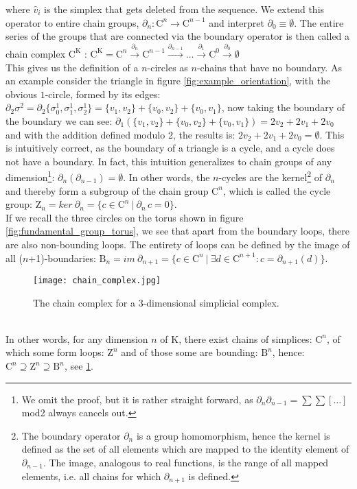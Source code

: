 where $\hat{v}_{i}$ is the simplex that gets deleted from the sequence.
We extend this operator to entire chain groups, $\partial_{n}: \mathrm{C}^{n} \rightarrow \mathrm{C}^{n-1}$ and interpret $\partial_{0} \equiv \emptyset$.
The entire series of the groups that are connected via the boundary operator is then called a chain complex $\mathrm{C}^{\mathrm{K}}$ : $\mathrm{C}^{\mathrm{K}} = \mathrm{C}^{n} \overset{\partial_{n}}{\longrightarrow} \mathrm{C}^{n-1} \overset{\partial_{n-1}}{\longrightarrow} \dots \overset{\partial_{1}}{\longrightarrow} \mathrm{C}^{0} \overset{\partial_{0}}{\longrightarrow} \emptyset$\\
This gives us the definition of a $n$-circles as $n$-chains that have no boundary.
As an example consider the triangle in figure \ref{fig:example_orientation}, with the obvious $1$-circle, formed by its edges: $\partial_{2} \sigma^{2} = \partial_{2} \{ \sigma^{1}_{0}, \sigma^{1}_{1}, \sigma^{1}_{2} \} = \{v_{1}, v_{2}\} + \{v_{0}, v_{2}\} + \{v_{0}, v_{1}\}$, now taking the boundary of the boundary we can see: $\partial_{1} (\{v_{1}, v_{2}\} + \{v_{0}, v_{2}\} + \{v_{0}, v_{1}\}) = 2v_{2}+2v_{1}+2v_{0}$ and with the addition defined modulo 2, the results is: $2v_{2}+2v_{1}+2v_{0} = \emptyset$.
This is intuitively correct, as the boundary of a triangle is a cycle, and a cycle does not have a boundary.
In fact, this intuition generalizes to chain groups of any dimension\footnote{ We omit the proof, but it is rather straight forward, as $\partial_{n} \partial_{n-1} = \sum \sum [\dots]$ mod2 always cancels out.}: $\partial_{n}(\partial_{n-1}) = \emptyset$.
In other words, the $n$-cycles are the kernel\footnote{ The boundary operator $\partial_{n}$ is a group homomorphism, hence the kernel is defined as the set of all elements which are mapped to the identity element of $\partial_{n-1}$. The image, analogous to real functions, is the range of all mapped elements, i.e. all chains for which $\partial_{n+1}$ is defined.} of $\partial_{n}$ and thereby form a subgroup of the chain group $\mathrm{C}^{n}$, which is called the cycle group: $\mathrm{Z}_{n} = ker ~ \partial_{n} = \{ c \in \mathrm{C}^{n} ~ | ~ \partial_{n} \, c = 0\}$.\\
If we recall the three circles on the torus shown in figure \ref{fig:fundamental_group_torus}, we see that apart from the boundary loops, there are also non-bounding loops.
The entirety of loops can be defined by the image of all ($n$+1)-boundaries: $\mathrm{B}_{n} = im ~ \partial_{n+1} = \{ c \in \mathrm{C}^{n} ~|~ \exists d \in \mathrm{C}^{n+1} : c = \partial_{n+1}(d) \}$.
\begin{figure}[htb]
\centering
\texttt{[image: chain\_complex.jpg]}
\caption{The chain complex for a $3$-dimensional simplicial complex.}
\label{fig:chain_complex}
\end{figure}\\
In other words, for any dimension $n$ of $\mathrm{K}$, there exist chains of simplices: $\mathrm{C}^{n}$, of which some form loops: $\mathrm{Z}^{n}$ and of those some are bounding: $\mathrm{B}^{n}$, hence: $\mathrm{C}^{n} \supseteq \mathrm{Z}^{n} \supseteq \mathrm{B}^{n}$, see \ref{fig:chain_complex}.

